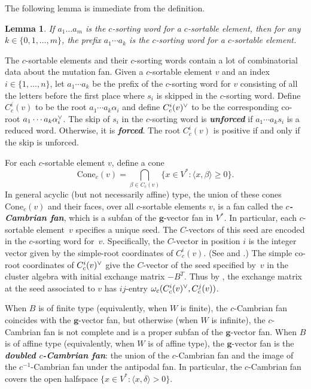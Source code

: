 \documentclass{amsart}
\newtheorem{lemma}[proposition]{Lemma}
\theoremstyle{definition}
\theoremstyle{remark}
\numberwithin{equation}{section}
\newcommand{\newword}[1]{\textbf{\emph{#1}}}
\newcommand{\set}[1]{{\lbrace #1 \rbrace}}
\newcommand{\br}[1]{{\langle #1 \rangle}}
\newcommand{\ck}{\spcheck}
\newcommand{\0}{{\mathbf{0}}}
\newcommand{\Cone}{\mathrm{Cone}}
\newcommand{\g}{\mathbf{g}}
\newcommand{\RSChar}{\Phi}
\newcommand{\RS}{\RSChar}
\begin{document}
The following lemma is immediate from the definition.
\begin{lemma}\label{any prefix}
If $a_1\ldots a_m$ is the $c$-sorting word for a $c$-sortable element, then for any $k\in\set{0,1,\ldots,m}$, the prefix $a_1\cdots a_k$ is the $c$-sorting word for a $c$-sortable element.
\end{lemma}


The $c$-sortable elements and their $c$-sorting words contain a lot of combinatorial data about the mutation fan.
Given a $c$-sortable element $v$ and an index $i\in\set{1,\ldots,n}$, let $a_1\cdots a_k$ be the prefix of the $c$-sorting word for $v$ consisting of all the letters before the first place where $s_i$ is skipped in the $c$-sorting word.
Define $C_c^i(v)$ to be the root $a_1\cdots a_k\alpha_i$ and define $C_c^i(v)\ck$ to be the corresponding co-root $a_1\cdots a_k\alpha\ck_i$.
The skip of $s_i$ in the $c$-sorting word is \newword{unforced} if $a_1\cdots a_ks_i$ is a reduced word.
Otherwise, it is \newword{forced}.
The root $C_c^i(v)$ is positive if and only if the skip is unforced.

For each $c$-sortable element $v$, define a cone  
\[\Cone_c(v)=\bigcap_{\beta \in C_c(v)}\set{x\in V^*:\br{x,\beta} \geq 0}.\]
In general acyclic (but not necessarily affine) type, the union of these cones $\Cone_c(v)$ and their faces, over all $c$-sortable elements $v$, is a fan called the \newword{$c$-Cambrian fan}, which is a subfan of the $\g$-vector fan in $V^*$.
In particular, each $c$-sortable element~$v$ specifies a unique seed.
The $C$-vectors of this seed are encoded in the $c$-sorting word for~$v$.
Specifically, the $C$-vector in position $i$ is the integer vector given by the simple-root coordinates of $C_c^i(v)$.
(See \cite[Therem~1.1]{framework} and \cite[Theorem~5.12]{framework}.)
The simple co-root coordinates of $C_c^i(v)\ck$ give the $C$-vector of the seed specified by~$v$ in the cluster algebra with initial exchange matrix $-B^T$.
Thus by \cite[Theorem~1.1]{framework}, the exchange matrix at the seed associated to $v$ has $ij$-entry $\omega_c(C_c^i(v)\ck,C_c^j(v))$.

When $B$ is of finite type (equivalently, when $W$ is finite), the $c$-Cambrian fan coincides with the $\g$-vector fan, but otherwise (when $W$ is infinite), the $c$-Cambrian fan is not complete and is a proper subfan of the $\g$-vector fan.
When $B$ is of affine type (equivalently, when $W$ is of affine type), the $\g$-vector fan is the \newword{doubled $c$-Cambrian fan}: the union of the \mbox{$c$-Cambrian} fan and the image of the \mbox{$c^{-1}$-Cambrian} fan under the antipodal fan. %
In particular, the $c$-Cambrian fan covers the open halfspace $\set{x\in V^*:\br{x,\delta}>0}$.
\end{document}
